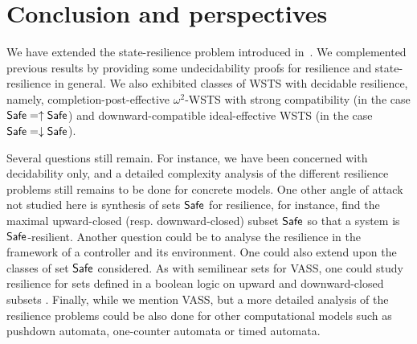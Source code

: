 



\section{Conclusion and perspectives}


We have extended the state-resilience problem introduced in~\cite{DBLP:journals/corr/PrasadZ16,DBLP:journals/corr/abs-2108-00889,DBLP:conf/gg/Ozkan22}.
We complemented previous results by providing some undecidability proofs for resilience and state-resilience in general. We also exhibited classes of WSTS with decidable resilience, namely, 
completion-post-effective $\omega^2$-WSTS with strong compatibility (in the case 
 $\textsf{Safe} = \uparrow \textsf{Safe}$) and 
downward-compatible
ideal-effective WSTS
(in the case %
 $\textsf{Safe} = \downarrow \textsf{Safe}$).

Several questions still remain.
For instance, we have been concerned with decidability only, and a detailed complexity analysis of the different resilience problems still remains to be done for concrete models. 
One other angle of attack not studied here is synthesis of sets %
$\textsf{Safe}$ for resilience,
for instance, %
 find the maximal upward-closed (resp. downward-closed) subset 
$\textsf{Safe}$ so that a system is $\textsf{Safe}$-resilient. 
Another question could be to analyse the resilience in the framework of a controller and its environment. 
One could also extend upon the classes of set $\textsf{Safe}$ %
 considered. As with semilinear sets for VASS, one could study resilience for sets defined in a boolean logic on upward and downward-closed subsets \cite{DBLP:journals/fmsd/BertrandS13}. Finally, while we mention VASS, but a more detailed analysis of the resilience problems could be also done for other computational models such as pushdown automata, one-counter automata or timed automata.


%
%
%
%


